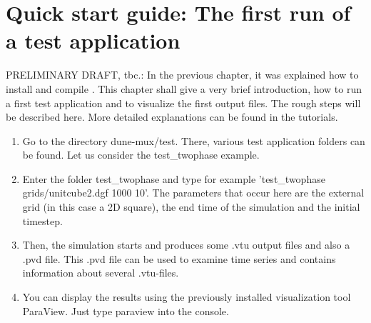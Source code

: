 \chapter[Quick start guide]{Quick start guide: The first run of a test application}

PRELIMINARY DRAFT, tbc.: In the previous chapter, it was explained how to install and compile \Dumux. This chapter shall give a very brief introduction, how to run a first test application and to visualize the first output files. The rough steps will be described here. More detailed explanations can be found in the tutorials.

\begin{enumerate}
 \item Go to the directory dune-mux/test. There, various test application folders can be found. Let us consider the test{\_}twophase example.
 \item Enter the folder test{\_}twophase and type for example 'test{\_}twophase grids/unitcube2.dgf 1000 10'. The parameters that occur here are the external grid (in this case a 2D square), the end time of the simulation and the initial timestep.
 \item Then, the simulation starts and produces some .vtu output files and also a .pvd file. This .pvd file can be used to examine time series and contains information about several .vtu-files.
 \item You can display the results using the previously installed visualization tool ParaView. Just type paraview into the console.
\end{enumerate}


